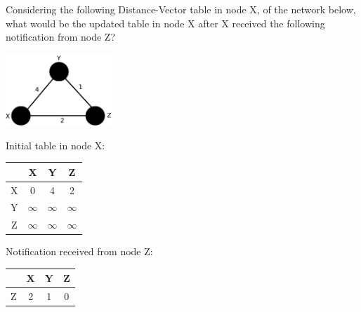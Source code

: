 \documentclass{llncs}
\begin{document}
Considering the following Distance-Vector table in node X, of the network below, what would be the updated table in node X after X received the following notification from node Z?\\

\begin{center}
  \includegraphics[width=0.3\textwidth]{graph1.pdf}
\end{center}

Initial table in node X:
\begin{center}
\begin{tabular}{c|c|c|c}
  & X & Y & Z \\
  \hline
  X & 0 & 4 & 2 \\
  Y & $\infty$ & $\infty$ & $\infty$\\
  Z & $\infty$ & $\infty$ & $\infty$\\
\end{tabular}
\end{center}

Notification received from node Z:
\begin{center}
\begin{tabular}{c|c|c|c}
  & X & Y & Z \\
  \hline
  Z & 2 & 1 & 0 \\
\end{tabular}
\end{center}
\end{document}
